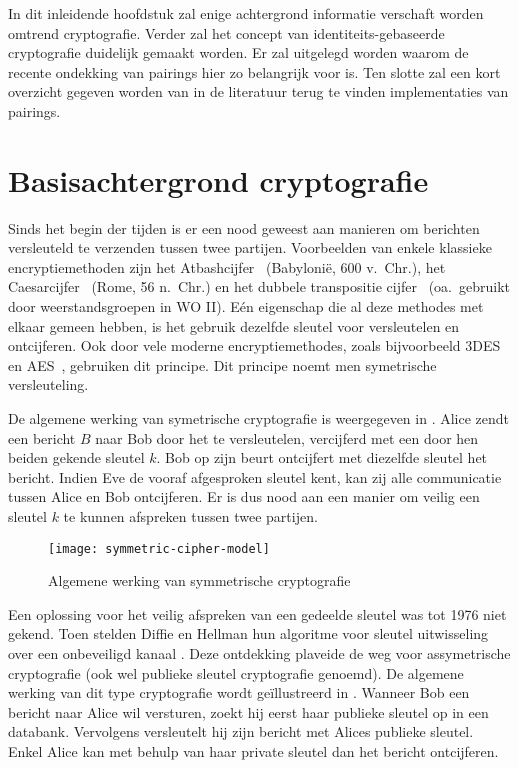 
 In dit inleidende hoofdstuk zal enige achtergrond informatie verschaft worden omtrend cryptografie. Verder zal het concept van identiteits-gebaseerde cryptografie duidelijk gemaakt worden. Er zal uitgelegd worden waarom de recente ondekking van pairings hier zo belangrijk voor is. Ten slotte zal een kort overzicht gegeven worden van in de literatuur terug te vinden implementaties van pairings.
\section{Basisachtergrond cryptografie}


Sinds het begin der tijden is er een nood geweest aan manieren om berichten versleuteld te verzenden tussen twee partijen. Voorbeelden van enkele klassieke encryptiemethoden zijn het Atbashcijfer~\cite{athbash} (Babyloni\"e, 600 v.\ Chr.), het Caesarcijfer~\cite{caesar} (Rome, 56 n.\ Chr.) en het dubbele transpositie cijfer~\cite{kahn} (oa.\ gebruikt door weerstandsgroepen in WO II). E\'en eigenschap die al deze methodes met elkaar gemeen hebben, is het gebruik dezelfde sleutel voor versleutelen en ontcijferen. Ook door vele moderne encryptiemethodes, zoals bijvoorbeeld 3DES~\cite{3des} en AES~\cite{aes}, gebruiken dit principe. Dit principe noemt men symetrische versleuteling.

De algemene werking van symetrische cryptografie is weergegeven in . Alice zendt een bericht $B$ naar Bob door het te versleutelen, vercijferd met een door hen beiden gekende sleutel $k$. Bob op zijn beurt ontcijfert met diezelfde sleutel het bericht. Indien Eve de vooraf afgesproken sleutel kent, kan zij alle communicatie tussen Alice en Bob ontcijferen. Er is dus nood aan een manier om veilig een sleutel $k$ te kunnen afspreken tussen twee partijen.

\begin{figure}[h]
	\centering
		\texttt{[image: symmetric-cipher-model]}
		\caption{Algemene werking van symmetrische cryptografie\label{fig-encryptie-applicaties-sym-cipher}}
\end{figure}

Een oplossing voor het veilig afspreken van een gedeelde sleutel was tot 1976 niet gekend. Toen stelden Diffie en Hellman hun algoritme voor sleutel uitwisseling over een onbeveiligd kanaal \cite{diffie-hellman}. Deze ontdekking plaveide de weg voor assymetrische cryptografie (ook wel publieke sleutel cryptografie genoemd). De algemene werking van dit type cryptografie wordt ge\"illustreerd in . Wanneer Bob een bericht naar Alice wil versturen, zoekt hij eerst haar publieke sleutel op in een databank. Vervolgens versleutelt hij zijn bericht met Alices publieke sleutel. Enkel Alice kan met behulp van haar private sleutel dan het bericht ontcijferen.

